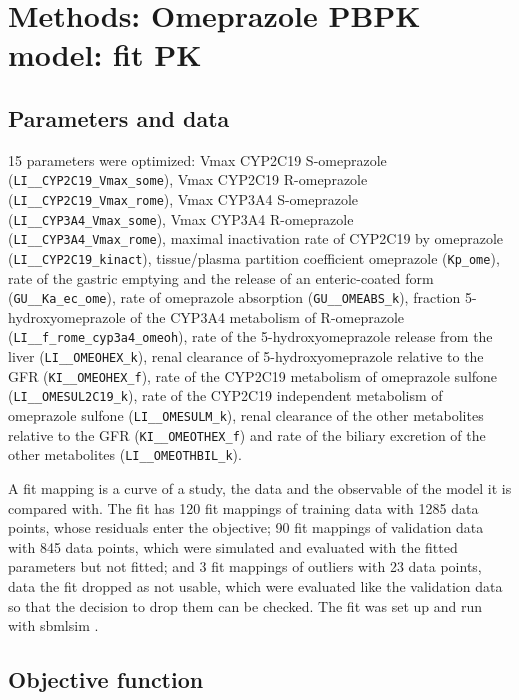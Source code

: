 \section{Methods: Omeprazole PBPK model: fit PK}

\subsection{Parameters and data}

15 parameters were optimized: Vmax CYP2C19 S-omeprazole (\texttt{LI\_\_CYP2C19\_Vmax\_some}), Vmax CYP2C19 R-omeprazole (\texttt{LI\_\_CYP2C19\_Vmax\_rome}), Vmax CYP3A4 S-omeprazole (\texttt{LI\_\_CYP3A4\_Vmax\_some}), Vmax CYP3A4 R-omeprazole (\texttt{LI\_\_CYP3A4\_Vmax\_rome}), maximal inactivation rate of CYP2C19 by omeprazole (\texttt{LI\_\_CYP2C19\_kinact}), tissue/plasma partition coefficient omeprazole (\texttt{Kp\_ome}), rate of the gastric emptying and the release of an enteric-coated form (\texttt{GU\_\_Ka\_ec\_ome}), rate of omeprazole absorption (\texttt{GU\_\_OMEABS\_k}), fraction 5-hydroxyomeprazole of the CYP3A4 metabolism of R-omeprazole (\texttt{LI\_\_f\_rome\_cyp3a4\_omeoh}), rate of the 5-hydroxyomeprazole release from the liver (\texttt{LI\_\_OMEOHEX\_k}), renal clearance of 5-hydroxyomeprazole relative to the GFR (\texttt{KI\_\_OMEOHEX\_f}), rate of the CYP2C19 metabolism of omeprazole sulfone (\texttt{LI\_\_OMESUL2C19\_k}), rate of the CYP2C19 independent metabolism of omeprazole sulfone (\texttt{LI\_\_OMESULM\_k}), renal clearance of the other metabolites relative to the GFR (\texttt{KI\_\_OMEOTHEX\_f}) and rate of the biliary excretion of the other metabolites (\texttt{LI\_\_OMEOTHBIL\_k}).

A fit mapping is a curve of a study, the data and the observable of the model it is compared with. The fit has 120 fit mappings of training data with 1285 data points, whose residuals enter the objective; 90 fit mappings of validation data with 845 data points, which were simulated and evaluated with the fitted parameters but not fitted; and 3 fit mappings of outliers with 23 data points, data the fit dropped as not usable, which were evaluated like the validation data so that the decision to drop them can be checked. The fit was set up and run with sbmlsim \cite{Koenig2026_sbmlsim}.

\subsection{Objective function}


